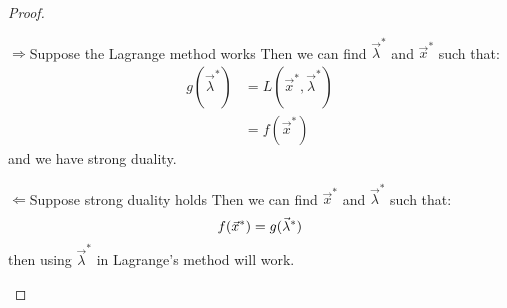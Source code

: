 \documentclass[../Main.tex]{subfiles}
\begin{document}
\begin{proof}
    \begin{proofdirection}{$\Rightarrow$}{Suppose the Lagrange method works}
        Then we can find $\vec{\lambda}^*$ and $\vec{x}^*$ such that:
        \begin{align*}
            g(\vec{\lambda}^*) &= L(\vec{x}^*, \vec{\lambda}^*) \\
            &= f(\vec{x}^*)
        \end{align*}
        and we have strong duality.
    \end{proofdirection}
    \begin{proofdirection}{$\Leftarrow$}{Suppose strong duality holds}
        Then we can find $\vec{x}^*$ and $\vec{\lambda}^*$ such that:
        \begin{equation*}
            f(\vec{x}^*) = g(\vec{\lambda}^*) \\
        \end{equation*}
        then using $\vec{\lambda}^*$ in Lagrange's method will work.
    \end{proofdirection}
\end{proof}
\end{document}
